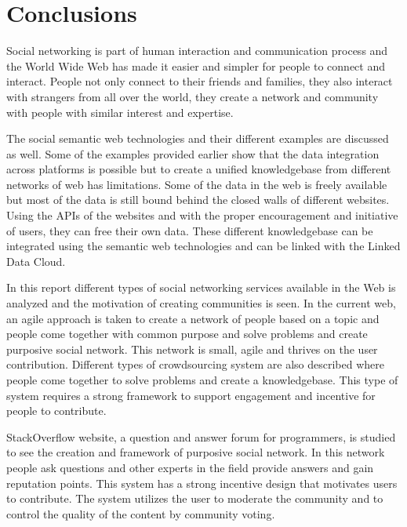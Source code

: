 

\chapter{Conclusions} \label{Chapter: Conclusions}

Social networking is part of human interaction and communication process and the World Wide Web has made it easier and simpler for people to connect and interact. People not only connect to their friends and families, they also interact with strangers from all over the world, they create a network and community with people with similar interest and expertise.

The social semantic web technologies and their different examples are discussed as well. Some of the examples provided earlier show that the data integration across platforms is possible but to create a unified knowledgebase from different networks of web has limitations. Some of the data in the web is freely available but most of the data is still bound behind the closed walls of different websites. Using the APIs of the websites and with the proper encouragement and initiative of users, they can free their own data. These different knowledgebase can be integrated using the semantic web technologies and can be linked with the Linked Data Cloud.

In this report different types of social networking services available in the Web is analyzed and the motivation of creating communities is seen. In the current web, an agile approach is taken to create a network of people based on a topic and people come together with common purpose and solve problems and create purposive social network. This network is small, agile and thrives on the user contribution. Different types of crowdsourcing system are also described where people come together to solve problems and create a knowledgebase. This type of system requires a strong framework to support engagement and incentive for people to contribute.

StackOverflow website, a question and answer forum for programmers, is studied to see the creation and framework of purposive social network. In this network people ask questions and other experts in the field provide answers and gain reputation points. This system has a strong incentive design that motivates users to contribute. The system utilizes the user to moderate the community and to control the quality of the content by community voting.

